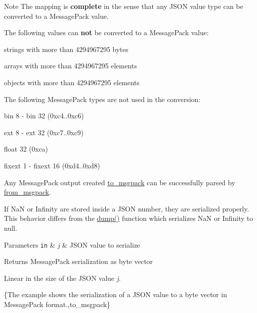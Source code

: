 \begin{DoxyNote}{Note}
The mapping is {\bfseries complete} in the sense that any J\+S\+ON value type can be converted to a Message\+Pack value.

The following values can {\bfseries not} be converted to a Message\+Pack value\+:
\begin{DoxyItemize}
\item strings with more than 4294967295 bytes
\item arrays with more than 4294967295 elements
\item objects with more than 4294967295 elements
\end{DoxyItemize}

The following Message\+Pack types are not used in the conversion\+:
\begin{DoxyItemize}
\item bin 8 -\/ bin 32 (0xc4..0xc6)
\item ext 8 -\/ ext 32 (0xc7..0xc9)
\item float 32 (0xca)
\item fixext 1 -\/ fixext 16 (0xd4..0xd8)
\end{DoxyItemize}

Any Message\+Pack output created \mbox{\hyperlink{classnlohmann_1_1basic__json_a09ca1dc273d226afe0ca83a9d7438d9c}{to\+\_\+msgpack}} can be successfully parsed by \mbox{\hyperlink{classnlohmann_1_1basic__json_aab804530006701b136ef9a0bc961434b}{from\+\_\+msgpack}}.

If NaN or Infinity are stored inside a J\+S\+ON number, they are serialized properly. This behavior differs from the \mbox{\hyperlink{classnlohmann_1_1basic__json_a5adea76fedba9898d404fef8598aa663}{dump()}} function which serializes NaN or Infinity to {\ttfamily null}.
\end{DoxyNote}

\begin{DoxyParams}[1]{Parameters}
\mbox{\tt in}  & {\em j} & J\+S\+ON value to serialize \\
\hline
\end{DoxyParams}
\begin{DoxyReturn}{Returns}
Message\+Pack serialization as byte vector
\end{DoxyReturn}
Linear in the size of the J\+S\+ON value {\itshape j}.

\{The example shows the serialization of a J\+S\+ON value to a byte vector in Message\+Pack format.,to\+\_\+msgpack\}

